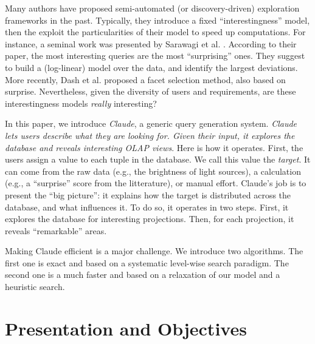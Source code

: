 Many authors have proposed semi-automated (or discovery-driven) exploration
frameworks in the past. Typically, they introduce a fixed ``interestingness''
model, then the exploit the particularities of their model to speed up
computations.  For instance, a seminal work was presented by Sarawagi et al.
\cite{sarawagi1998discovery}. According to their paper, the most interesting
queries are the most ``surprising'' ones.  They suggest to build a (log-linear)
model over the data, and identify the largest deviations. More recently, Dash
et al.\cite{dash2008dynamic} proposed a facet selection method, also based on
surprise. Nevertheless, given the diversity of users and requirements, are
these interestingness models \emph{really} interesting?

In this paper, we introduce \textit{Claude}, a generic query generation
system. \emph{Claude lets users describe what they are looking for.
Given their input, it explores the database and reveals interesting OLAP views}.
Here is how it operates. First, the users assign a value to each tuple in
the database.  We call this value the \emph{target}. It can come from the raw
data (e.g., the brightness of light sources), a calculation (e.g., a
``surprise'' score from the litterature), or manual effort. Claude's job is to
present the ``big picture'': it explains how the target is distributed across
the database, and what influences it. To do so, it operates in two steps.
First, it explores the database for interesting projections. Then, for each
projection, it reveals ``remarkable'' areas. 

Making Claude efficient is a major challenge. We
introduce two algorithms.  The first one is exact and based on a systematic
level-wise search paradigm.  The second one is a much faster and based on a
relaxation of our model and a heuristic search.

\section{Presentation and Objectives}

